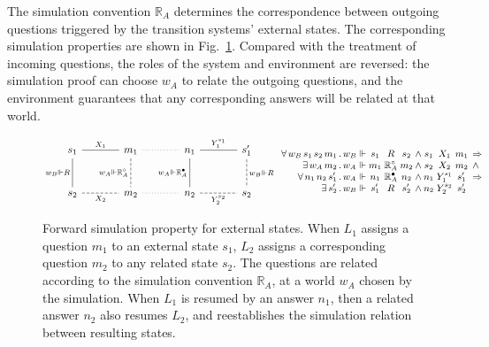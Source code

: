 \documentclass[draft,11pt]{report}
\theoremstyle{definition}
\newcommand{\que}{\circ}         %
\newcommand{\ans}{\bullet}       %
\begin{document}
The simulation convention $\mathbb{R}_A$
determines the correspondence between
outgoing questions triggered by
the transition systems' external states.
The corresponding simulation properties
are shown in Fig.~\ref{fig:fsim-ext}.
Compared with the treatment of incoming questions,
the roles of the system and environment are reversed:
the simulation proof can choose $w_A$
to relate the outgoing questions,
and the environment guarantees that any corresponding answers
will be related at that world.

\begin{figure} %
  \[
      \begin{tikzcd}[sep=large,baseline=-3pt]
        s_1 \ar[r, "X_1", dash] \ar[d, "w_B \Vdash R"', dash] &
        m_1 \ar[r, dotted, dash] \ar[d, "w_A \Vdash \mathbb{R}_A^\que"', dash, dashed] &
        n_1 \ar[r, "Y_1^{s_1}", dash] \ar[d, "w_A \Vdash \mathbb{R}_A^\ans"', dash] &
        s_1' \ar[d, "w_B \Vdash R", dash, dashed]
        \\
        s_2 \ar[r, "X_2"', dash, dashed] &
        m_2 \ar[r, dotted, dash] &
        n_2 \ar[r, "Y_2^{s_2}"', dash, dashed] &
        s_2
      \end{tikzcd}
      \small
      \begin{array}{
          r @{\,.\,} l @{{} \Vdash {}} c@{}c@{}c @{\:\wedge\:}
                                    c@{}c@{}c @{\:\:} l}
        \forall \, w_B \, s_1 \, s_2 \, m_1 & w_B & s_1 & {}\mathrel{R}{} & s_2 &
                        s_1 & {}\mathrel{X_1}{} & m_1 & \Rightarrow \\
        \exists \, w_A \, m_2 & w_A & m_1 & {}\mathrel{\mathbb{R}_A^\que}{} & m_2 &
                        s_2 & {}\mathrel{X_2}{} & m_2 & \wedge \\
        \forall \, n_1 \, n_2 \, s_1' & w_A & n_1 & {}\mathrel{\mathbb{R}_A^\ans}{} & n_2 &
                        n_1 & {}\mathrel{Y_1^{s_1}}{} & s_1' & \Rightarrow \\
        \exists \, s_2' & w_B & s_1' & {}\mathrel{R}{} & s_2' &
                        n_2 & {}\mathrel{Y_2^{s_2}}{} & s_2' &
      \end{array}
  \]
  \caption{Forward simulation property for external states.
    When $L_1$ assigns a question $m_1$ to an external state $s_1$,
    $L_2$ assigns a corresponding question $m_2$ to any related state $s_2$.
    The questions are related according to
    the simulation convention $\mathbb{R}_A$,
    at a world $w_A$ chosen by the simulation.
    When $L_1$ is resumed by an answer $n_1$,
    then a related answer $n_2$ also resumes $L_2$,
    and reestablishes the simulation relation
    between resulting states.}
  \label{fig:fsim-ext}
\end{figure}
\end{document}
